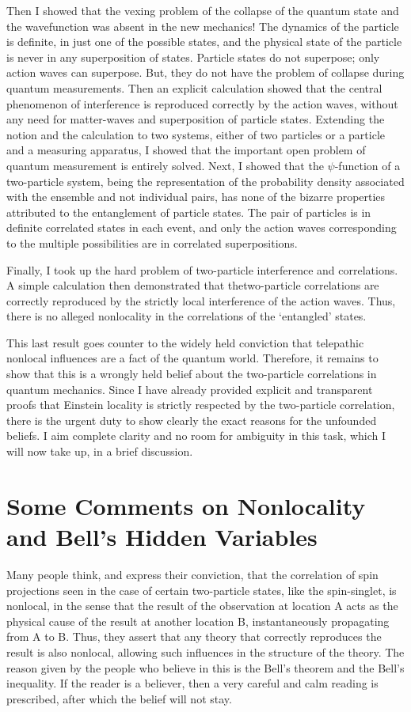 Then I showed that the vexing problem of the collapse of the quantum state and the
wavefunction was absent in the new mechanics! The dynamics of the particle is definite, in
just one of the possible states, and the physical state of the particle is never in any 
superposition of states. Particle states do not superpose; only action waves can superpose. 
But, they do not have the problem of collapse during quantum measurements. Then an explicit
calculation showed that the central phenomenon of interference is reproduced correctly by
the action waves, without any need for matter-waves and superposition of particle states.
Extending the notion and the calculation to two systems, either of two particles or a 
particle and a measuring apparatus, I showed that the important open problem of quantum
measurement is entirely solved. Next, I showed that the $\psi$-function of a two-particle 
system, being the representation of the probability density associated with the ensemble and 
not individual pairs, has none of the bizarre properties attributed to the entanglement of
particle states. The pair of particles is in definite correlated states in each event, and only
the action waves corresponding to the multiple possibilities are in correlated superpositions.

Finally, I took up the hard problem of two-particle interference and correlations. A simple
calculation then demonstrated that the\break two-particle correlations are correctly reproduced by
the strictly local interference of the action waves. Thus, there is no alleged nonlocality in
the correlations of the `entangled' states.

This last result goes counter to the widely held conviction that telepathic nonlocal influences are a fact of the quantum world. Therefore, it remains to show that this is a wrongly held belief about the two-particle correlations in quantum mechanics. Since I have already provided explicit and transparent proofs that Einstein locality is strictly respected by the two-particle correlation, there is the urgent duty to show clearly the exact reasons for the unfounded beliefs. I aim complete clarity and no room for ambiguity in this task, which I will now take up, in a brief discussion.

\section{Some Comments on Nonlocality and Bell's Hidden Variables}\label{c14-sec9}

Many people think, and express their conviction, that the correlation of spin projections
seen in the case of certain two-particle states, like the spin-singlet, is nonlocal, in the sense
that the result of the observation at location A acts as the physical cause of the result at
another location B, instantaneously propagating from A to B. Thus, they assert that any
theory that correctly reproduces the result is also nonlocal, allowing such influences in the
structure of the theory. The reason given by the people who believe in this is the Bell's
theorem and the Bell's inequality. If the reader is a believer, then a very careful and calm
reading is prescribed, after which the belief will not stay.

